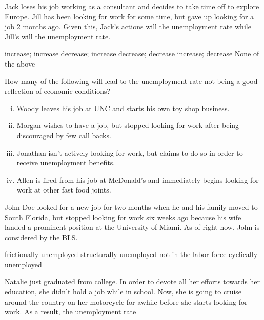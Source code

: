 \documentclass[addpoints,11pt]{exam}
\theoremstyle{definition}
\newcommand{\blank}[0]{\underline{\hspace{3cm}}}
\begin{document}
\begin{questions}
\question Jack loses his job working as a consultant and decides to take time off to explore Europe. Jill has been looking for work for some time, but gave up looking for a job 2 months ago. Given this, Jack's actions will \blank the unemployment rate while Jill's will \blank the unemployment rate.

\begin{choices}
	\choice increase; increase
	\choice decrease; increase
	\choice	decrease; decrease
	\CorrectChoice increase; decrease
	\choice None of the above
\end{choices}


\question How many of the following will lead to the unemployment rate not being a good reflection of economic conditions?

\begin{enumerate}[i.]
	\item Woody leaves his job at UNC and starts his own toy shop business.
	\item Morgan wishes to have a job, but stopped looking for work after being discouraged by few call backs.
	\item Jonathan isn't actively looking for work, but claims to do so in order to receive unemployment benefits.
	\item Allen is fired from his job at McDonald's and immediately begins looking for work at other fast food joints.
\end{enumerate}

\begin{choices}
\end{choices}

	
\question John Doe looked for a new job for two months when he and his family moved to South Florida, but stopped looking for work six weeks ago because his wife landed a prominent position at the University of Miami. As of right now, John is considered \blank by the BLS.

\begin{choices}
	\choice frictionally unemployed
	\choice structurally unemployed 
	\CorrectChoice not in the labor force
	\choice cyclically unemployed
\end{choices}



\question Natalie just graduated from college. In order to devote all her efforts towards her education, she didn't hold a job while in school. Now, she is going to cruise around the country on her motorcycle for awhile before she starts looking for work. As a result, the unemployment rate


\end{questions}
\end{document}
